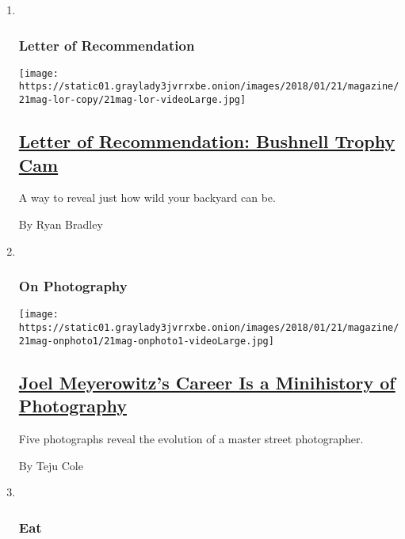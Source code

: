 \begin{enumerate}
\def\labelenumi{\arabic{enumi}.}
\item ~
  \hypertarget{letter-of-recommendation}{%
  \subsubsection{Letter of
  Recommendation}\label{letter-of-recommendation}}

  \texttt{[image: https://static01.graylady3jvrrxbe.onion/images/2018/01/21/magazine/21mag-lor-copy/21mag-lor-videoLarge.jpg]}

  \hypertarget{letter-of-recommendation-bushnell-trophy-cam}{%
  \subsection{\texorpdfstring{\href{/2018/01/18/magazine/letter-of-recommendation-bushnell-trophy-cam.html}{Letter
  of Recommendation: Bushnell Trophy
  Cam}}{Letter of Recommendation: Bushnell Trophy Cam}}\label{letter-of-recommendation-bushnell-trophy-cam}}

  A way to reveal just how wild your backyard can be.

  By Ryan Bradley
\item ~
  \hypertarget{on-photography}{%
  \subsubsection{On Photography}\label{on-photography}}

  \texttt{[image: https://static01.graylady3jvrrxbe.onion/images/2018/01/21/magazine/21mag-onphoto1/21mag-onphoto1-videoLarge.jpg]}

  \hypertarget{joel-meyerowitzs-career-is-a-minihistory-of-photography}{%
  \subsection{\texorpdfstring{\href{/2018/01/18/magazine/joel-meyerowitzs-career-is-minihistory-of-photography.html}{Joel
  Meyerowitz's Career Is a Minihistory of
  Photography}}{Joel Meyerowitz's Career Is a Minihistory of Photography}}\label{joel-meyerowitzs-career-is-a-minihistory-of-photography}}

  Five photographs reveal the evolution of a master street photographer.

  By Teju Cole
\item ~
  \hypertarget{eat}{%
  \subsubsection{Eat}\label{eat}}


\end{enumerate}
